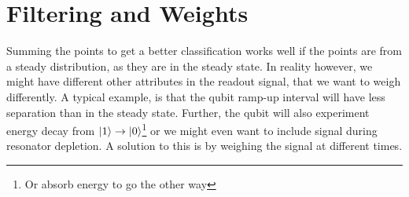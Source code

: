 


\section{Filtering and Weights}
Summing the points to get a better classification works well if the points are from a steady distribution, as they are in the steady state. In reality however, we might have different other attributes in the readout signal, that we want to weigh differently. A typical example, is that the qubit ramp-up interval will have less separation than in the steady state. Further, the qubit will also experiment energy decay from $\ket{1}\to \ket{0}$\footnote{Or absorb energy to go the other way} or we might even want to include signal during resonator depletion. A solution to this is by weighing the signal at different times. 

